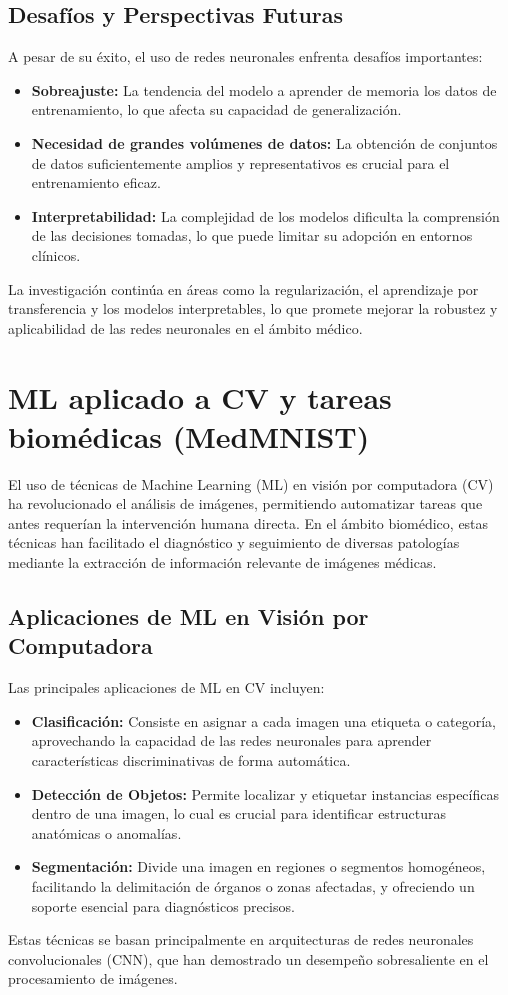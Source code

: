 \documentclass[11pt,spanish,listoffigures,listoftables]{tfgetsinf}
\begin{document}
\subsection{Desafíos y Perspectivas Futuras}
A pesar de su éxito, el uso de redes neuronales enfrenta desafíos importantes:
\begin{itemize}
    \item \textbf{Sobreajuste:} La tendencia del modelo a aprender de memoria los datos de entrenamiento, lo que afecta su capacidad de generalización.
    \item \textbf{Necesidad de grandes volúmenes de datos:} La obtención de conjuntos de datos suficientemente amplios y representativos es crucial para el entrenamiento eficaz.
    \item \textbf{Interpretabilidad:} La complejidad de los modelos dificulta la comprensión de las decisiones tomadas, lo que puede limitar su adopción en entornos clínicos.
\end{itemize}
La investigación continúa en áreas como la regularización, el aprendizaje por transferencia y los modelos interpretables, lo que promete mejorar la robustez y aplicabilidad de las redes neuronales en el ámbito médico.

\section{ML aplicado a CV y tareas biomédicas (MedMNIST)}
El uso de técnicas de Machine Learning (ML) en visión por computadora (CV) ha revolucionado el análisis de imágenes, permitiendo automatizar tareas que antes requerían la intervención humana directa. En el ámbito biomédico, estas técnicas han facilitado el diagnóstico y seguimiento de diversas patologías mediante la extracción de información relevante de imágenes médicas.

\subsection{Aplicaciones de ML en Visión por Computadora}
Las principales aplicaciones de ML en CV incluyen:
\begin{itemize}
    \item \textbf{Clasificación:} Consiste en asignar a cada imagen una etiqueta o categoría, aprovechando la capacidad de las redes neuronales para aprender características discriminativas de forma automática.
    \item \textbf{Detección de Objetos:} Permite localizar y etiquetar instancias específicas dentro de una imagen, lo cual es crucial para identificar estructuras anatómicas o anomalías.
    \item \textbf{Segmentación:} Divide una imagen en regiones o segmentos homogéneos, facilitando la delimitación de órganos o zonas afectadas, y ofreciendo un soporte esencial para diagnósticos precisos.
\end{itemize}
Estas técnicas se basan principalmente en arquitecturas de redes neuronales convolucionales (CNN), que han demostrado un desempeño sobresaliente en el procesamiento de imágenes.
\end{document}
